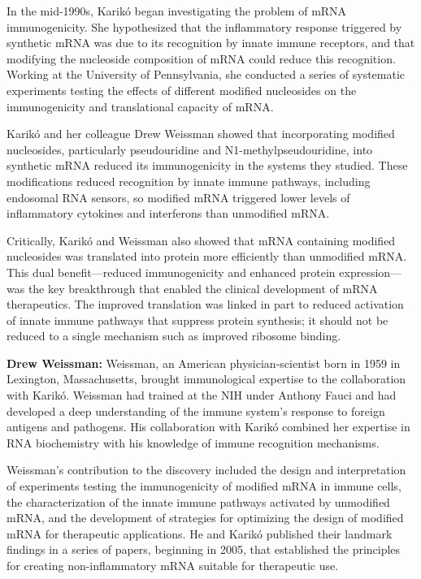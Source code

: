 In the mid-1990s, Karik\'o began investigating the problem of mRNA immunogenicity. She hypothesized that the inflammatory response triggered by synthetic mRNA was due to its recognition by innate immune receptors, and that modifying the nucleoside composition of mRNA could reduce this recognition. Working at the University of Pennsylvania, she conducted a series of systematic experiments testing the effects of different modified nucleosides on the immunogenicity and translational capacity of mRNA.

Karik\'o and her colleague Drew Weissman showed that incorporating modified nucleosides, particularly pseudouridine and N1-methylpseudouridine, into synthetic mRNA reduced its immunogenicity in the systems they studied. These modifications reduced recognition by innate immune pathways, including endosomal RNA sensors, so modified mRNA triggered lower levels of inflammatory cytokines and interferons than unmodified mRNA.

Critically, Karik\'o and Weissman also showed that mRNA containing modified nucleosides was translated into protein more efficiently than unmodified mRNA. This dual benefit---reduced immunogenicity and enhanced protein expression---was the key breakthrough that enabled the clinical development of mRNA therapeutics. The improved translation was linked in part to reduced activation of innate immune pathways that suppress protein synthesis; it should not be reduced to a single mechanism such as improved ribosome binding.

\textbf{Drew Weissman:} Weissman, an American physician-scientist born in 1959 in Lexington, Massachusetts, brought immunological expertise to the collaboration with Karik\'o. Weissman had trained at the NIH under Anthony Fauci and had developed a deep understanding of the immune system's response to foreign antigens and pathogens. His collaboration with Karik\'o combined her expertise in RNA biochemistry with his knowledge of immune recognition mechanisms.

Weissman's contribution to the discovery included the design and interpretation of experiments testing the immunogenicity of modified mRNA in immune cells, the characterization of the innate immune pathways activated by unmodified mRNA, and the development of strategies for optimizing the design of modified mRNA for therapeutic applications. He and Karik\'o published their landmark findings in a series of papers, beginning in 2005, that established the principles for creating non-inflammatory mRNA suitable for therapeutic use.

